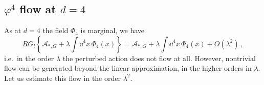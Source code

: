 \subsection*{\texorpdfstring{$\varphi^4$}{phi**4} flow at \texorpdfstring{$d=4$}{d=4}}

As at $d=4$ the field $\Phi_4$ is marginal, we have
\begin{equation}\label{eq:marginal4}
RG_l\left\{\mathcal A_{*,G}+\lambda\int \dd^4x\,\Phi_4(x)\right\}=\mathcal A_{*,G}+\lambda\int \dd^4x\,\Phi_4(x)+O(\lambda^2)\,,
\end{equation}
i.e.\ in the order $\lambda$ the perturbed action does not flow at all. However,
nontrivial flow can be generated beyond the linear approximation, in the higher
orders in $\lambda$. Let us estimate this flow in the order $\lambda^2$.

